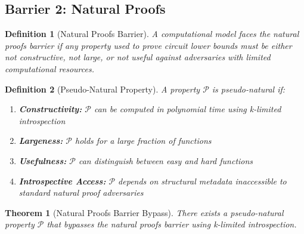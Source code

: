\documentclass[11pt]{article}
\newtheorem{definition}{Definition}
\newtheorem{theorem}{Theorem}
\begin{document}
\subsection{Barrier 2: Natural Proofs}

\begin{definition}[Natural Proofs Barrier]
A computational model faces the natural proofs barrier if any property used to prove circuit lower bounds must be either not constructive, not large, or not useful against adversaries with limited computational resources.
\end{definition}

\begin{definition}[Pseudo-Natural Property]
A property $\mathcal{P}$ is pseudo-natural if:
\begin{enumerate}
\item \textbf{Constructivity:} $\mathcal{P}$ can be computed in polynomial time using k-limited introspection
\item \textbf{Largeness:} $\mathcal{P}$ holds for a large fraction of functions
\item \textbf{Usefulness:} $\mathcal{P}$ can distinguish between easy and hard functions
\item \textbf{Introspective Access:} $\mathcal{P}$ depends on structural metadata inaccessible to standard natural proof adversaries
\end{enumerate}
\end{definition}

\begin{theorem}[Natural Proofs Barrier Bypass]
There exists a pseudo-natural property $\mathcal{P}$ that bypasses the natural proofs barrier using k-limited introspection.
\end{theorem}
\end{document}
